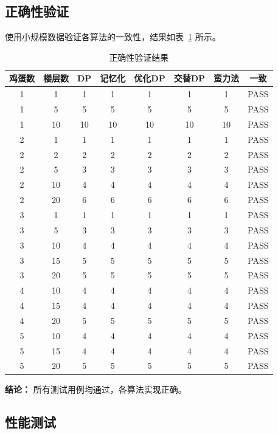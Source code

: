 \documentclass[12pt,a4paper]{article}
\begin{document}
\subsection{正确性验证}

使用小规模数据验证各算法的一致性，结果如表~\ref{tab:correctness} 所示。

\begin{table}[H]
\centering
\caption{正确性验证结果}
\label{tab:correctness}
\begin{tabular}{@{}cccccccc@{}}
\toprule
\textbf{鸡蛋数} & \textbf{楼层数} & \textbf{DP} & \textbf{记忆化} & \textbf{优化DP} & \textbf{交替DP} & \textbf{蛮力法} & \textbf{一致} \\
\midrule
1 & 1 & 1 & 1 & 1 & 1 & 1 & PASS \\
1 & 5 & 5 & 5 & 5 & 5 & 5 & PASS \\
1 & 10 & 10 & 10 & 10 & 10 & 10 & PASS \\
2 & 1 & 1 & 1 & 1 & 1 & 1 & PASS \\
2 & 2 & 2 & 2 & 2 & 2 & 2 & PASS \\
2 & 5 & 3 & 3 & 3 & 3 & 3 & PASS \\
2 & 10 & 4 & 4 & 4 & 4 & 4 & PASS \\
2 & 20 & 6 & 6 & 6 & 6 & 6 & PASS \\
3 & 1 & 1 & 1 & 1 & 1 & 1 & PASS \\
3 & 5 & 3 & 3 & 3 & 3 & 3 & PASS \\
3 & 10 & 4 & 4 & 4 & 4 & 4 & PASS \\
3 & 15 & 5 & 5 & 5 & 5 & 5 & PASS \\
3 & 20 & 5 & 5 & 5 & 5 & 5 & PASS \\
4 & 10 & 4 & 4 & 4 & 4 & 4 & PASS \\
4 & 15 & 4 & 4 & 4 & 4 & 4 & PASS \\
4 & 20 & 5 & 5 & 5 & 5 & 5 & PASS \\
5 & 10 & 4 & 4 & 4 & 4 & 4 & PASS \\
5 & 15 & 4 & 4 & 4 & 4 & 4 & PASS \\
5 & 20 & 5 & 5 & 5 & 5 & 5 & PASS \\
\bottomrule
\end{tabular}
\end{table}

\textbf{结论：} 所有测试用例均通过，各算法实现正确。

\subsection{性能测试}
\end{document}
